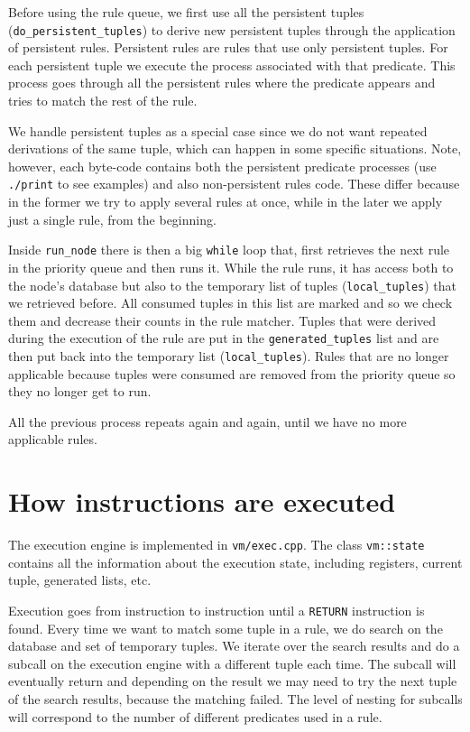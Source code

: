 \documentclass[11pt]{article}
\begin{document}
Before using the rule queue, we first use all the persistent tuples (\texttt{do\_persistent\_tuples}) to derive new persistent tuples through the application of persistent rules. Persistent rules are rules that use only persistent tuples. For each persistent tuple we execute the process associated with that predicate. This process goes through all the persistent rules where the predicate appears and tries to match the rest of the rule.

We handle persistent tuples as a special case since we do not want repeated derivations of the same tuple, which can happen in some specific situations. Note, however, each byte-code contains both the persistent predicate processes (use \texttt{./print} to see examples) and also non-persistent rules code. These differ because in the former we try to apply several rules at once, while in the later we apply just a single rule, from the beginning.

Inside \texttt{run\_node} there is then a big \texttt{while} loop that, first retrieves the next rule in the priority queue and then runs it. While the rule runs, it has access both to the node's database but also to the temporary list of tuples (\texttt{local\_tuples}) that we retrieved before. All consumed tuples in this list are marked and so we check them and decrease their counts in the rule matcher. Tuples that were derived during the execution of the rule are put in the \texttt{generated\_tuples} list and are then put back into the temporary list (\texttt{local\_tuples}). Rules that are no longer applicable because tuples were consumed are removed from the priority queue so they no longer get to run.

All the previous process repeats again and again, until we have no more applicable rules.

\section{How instructions are executed}

The execution engine is implemented in \texttt{vm/exec.cpp}. The class \texttt{vm::state} contains all the information about the execution state, including registers, current tuple, generated lists, etc.

Execution goes from instruction to instruction until a \texttt{RETURN} instruction is found. Every time we want to match some tuple in a rule, we do search on the database and set of temporary tuples. We iterate over the search results and do a subcall on the execution engine with a different tuple each time. The subcall will eventually return and depending on the result we may need to try the next tuple of the search results, because the matching failed. The level of nesting for subcalls will correspond to the number of different predicates used in a rule.
\end{document}
